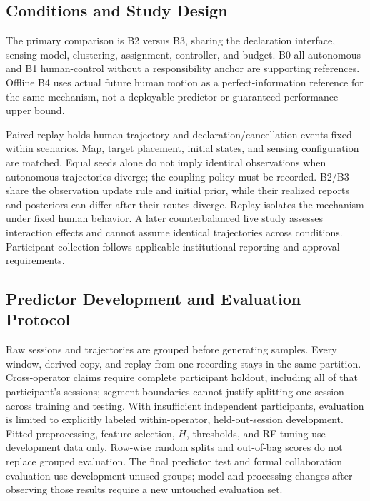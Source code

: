 \documentclass[conference]{IEEEtran}
\begin{document}
\subsection{Conditions and Study Design}
The primary comparison is B2 versus B3, sharing the declaration interface, sensing model, clustering, assignment, controller, and budget. B0 all-autonomous and B1 human-control without a responsibility anchor are supporting references. Offline B4 uses actual future human motion as a perfect-information reference for the same mechanism, not a deployable predictor or guaranteed performance upper bound.

Paired replay holds human trajectory and declaration/cancellation events fixed within scenarios. Map, target placement, initial states, and sensing configuration are matched. Equal seeds alone do not imply identical observations when autonomous trajectories diverge; the coupling policy must be recorded. B2/B3 share the observation update rule and initial prior, while their realized reports and posteriors can differ after their routes diverge. Replay isolates the mechanism under fixed human behavior. A later counterbalanced live study assesses interaction effects and cannot assume identical trajectories across conditions. Participant collection follows applicable institutional reporting and approval requirements.

\subsection{Predictor Development and Evaluation Protocol}
Raw sessions and trajectories are grouped before generating samples. Every window, derived copy, and replay from one recording stays in the same partition. Cross-operator claims require complete participant holdout, including all of that participant's sessions; segment boundaries cannot justify splitting one session across training and testing. With insufficient independent participants, evaluation is limited to explicitly labeled within-operator, held-out-session development. Fitted preprocessing, feature selection, $H$, thresholds, and RF tuning use development data only. Row-wise random splits and out-of-bag scores do not replace grouped evaluation. The final predictor test and formal collaboration evaluation use development-unused groups; model and processing changes after observing those results require a new untouched evaluation set.
\end{document}
